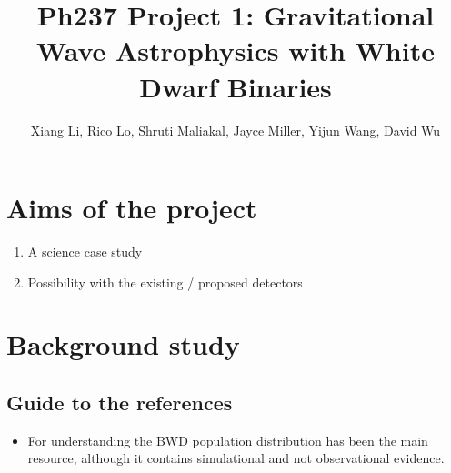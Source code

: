 \documentclass{article}
\title{Ph237 Project 1: Gravitational Wave Astrophysics with White Dwarf Binaries}
\author{Xiang Li, Rico Lo, Shruti Maliakal, Jayce Miller, Yijun Wang, David Wu}
\begin{document}
\maketitle

\section{Aims of the project}

\begin{enumerate}
    \item A science case study
    \item Possibility with the existing / proposed detectors
\end{enumerate}


\section{Background study}

\subsection*{Guide to the references}
\begin{itemize}
    \item For understanding the BWD population distribution \cite{Lamberts2019} has been the main resource, although it contains simulational and not observational evidence.
\end{itemize}
\end{document}
